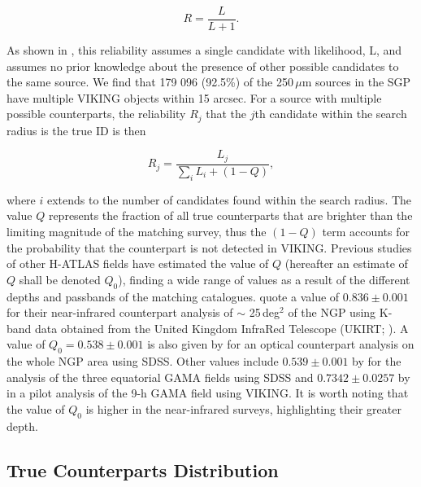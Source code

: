 \documentclass[fleqn,usenatbib]{mnras}
\begin{document}
\begin{equation}
\label{eq:reliability_single}
R = \frac{L}{L + 1}.
\end{equation}

As shown in \citealt{Sutherland_1992}, this reliability assumes a single candidate with likelihood, L, and assumes no prior knowledge about the presence of other possible candidates to the same source. We find that 179 096 (92.5\%) of the 250\,$\mu$m sources in the SGP have multiple VIKING objects within 15 arcsec. For a source with multiple possible counterparts, the reliability $R_j$ that the $j$th candidate within the search radius is the true ID is then

\begin{equation}
\label{eq:reliability_multi}
R_j = \frac{L_j}{\sum_i L_i + (1 - Q)},
\end{equation}

\noindent where $i$ extends to the number of candidates found within the search radius. The value $Q$ represents the fraction of all true counterparts that are brighter than the limiting magnitude of the matching survey, thus the $(1 - Q)$ term accounts for the probability that the counterpart is not detected in VIKING. Previous studies of other H-ATLAS fields have estimated the value of $Q$ (hereafter an estimate of $Q$ shall be denoted $Q_0$), finding a wide range of values as a result of the different depths and passbands of the matching catalogues. \citealt{Furlanetto_2018} quote a value of $0.836 \pm 0.001$ for their near-infrared counterpart analysis of $\sim$ 25\,deg$^{2}$ of the NGP using K-band data obtained from the United Kingdom InfraRed Telescope (UKIRT; \citealt{Casali_2007}). A value of $Q_0 = 0.538 \pm 0.001$ is also given by \citealt{Furlanetto_2018} for an optical counterpart analysis on the whole NGP area using SDSS. Other values include $0.539 \pm 0.001$ by \citealt{Bourne_2016} for the analysis of the three equatorial GAMA fields using SDSS and $0.7342 \pm 0.0257$ by \citealt{Fleuren_2012} in a pilot analysis of the 9-h GAMA field using VIKING. It is worth noting that the value of $Q_0$ is higher in the near-infrared surveys, highlighting their greater depth. 


\subsection{True Counterparts Distribution}
\label{sec:true_counterparts_distribution}
\end{document}
